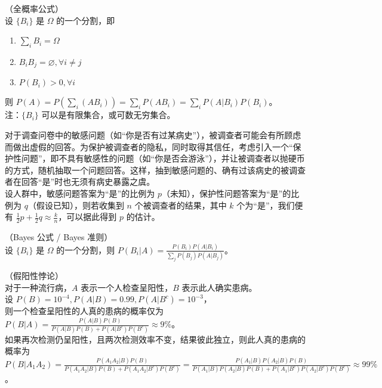 \documentclass[../main.tex]{subfiles}
\begin{document}
\begin{theorem}\label{thm:1.8.1}
    （全概率公式）\\
    设 $\{B_i\}$ 是 $\Omega$ 的一个分割，即
    \begin{enumerate}
        \item $\sum_iB_i=\Omega$
        \item $B_iB_j=\varnothing,\forall i\neq j$
        \item $P(B_i)>0,\forall i$
    \end{enumerate}
    则 $P(A)=P(\sum_{i}(AB_i))=\sum_iP(AB_i)=\sum_iP(A|B_i)P(B_i)$。\\
    注：$\{B_i\}$ 可以是有限集合，或可数无穷集合。
\end{theorem}

\begin{example}
    对于调查问卷中的敏感问题（如“你是否有过某病史”），被调查者可能会有所顾虑而做出虚假的回答。为保护被调查者的隐私，同时取得其信任，考虑引入一个“保护性问题”，即不具有敏感性的问题（如“你是否会游泳”），并让被调查者以抛硬币的方式，随机抽取一个问题回答。这样，抽到敏感问题的、确有过该病史的被调查者在回答“是”时也无须有病史暴露之虞。\\
    设人群中，敏感问题答案为“是”的比例为 $p$（未知），保护性问题答案为“是”的比例为 $q$（假设已知），则若收集到 $n$ 个被调查者的结果，其中 $k$ 个为“是”，我们便有 $\frac{1}{2}p+\frac{1}{2}q\approx \frac{k}{n}$，可以据此得到 $p$ 的估计。
\end{example}

\begin{theorem}\label{thm:1.8.2}
    （Bayes 公式 / Bayes 准则）\\
    设 $\{B_i\}$ 是 $\Omega$ 的一个分割，则 $P(B_i|A)=\frac{P(B_i)P(A|B_i)}{\sum_j P(B_j)P(A|B_j)}$。
\end{theorem}

\begin{example}
    （假阳性悖论）\\
    对于一种流行病，$A$ 表示一个人检查呈阳性，$B$ 表示此人确实患病。\\
    设 $P(B)=10^{-4},P(A|B)=0.99,P(A|B^c)=10^{-3}$，\\
    则一个检查呈阳性的人真的患病的概率仅为 $P(B|A)=\frac{P(A|B)P(B)}{P(A|B)P(B)+P(A|B^c)P(B^c)}\approx 9\%$。\\
    如果再次检测仍呈阳性，且两次检测效率不变，结果彼此独立，则此人真的患病的概率为 $P(B|A_1A_2)=\frac{P(A_1A_2|B)P(B)}{P(A_1A_2|B)P(B)+P(A_1A_2|B^c)P(B^c)}=\frac{P(A_1|B)P(A_2|B)P(B)}{P(A_1|B)P(A_2|B)P(B)+P(A_1|B^c)P(A_2|B^c)P(B^c)}\approx 99\%$。
\end{example}
\end{document}
